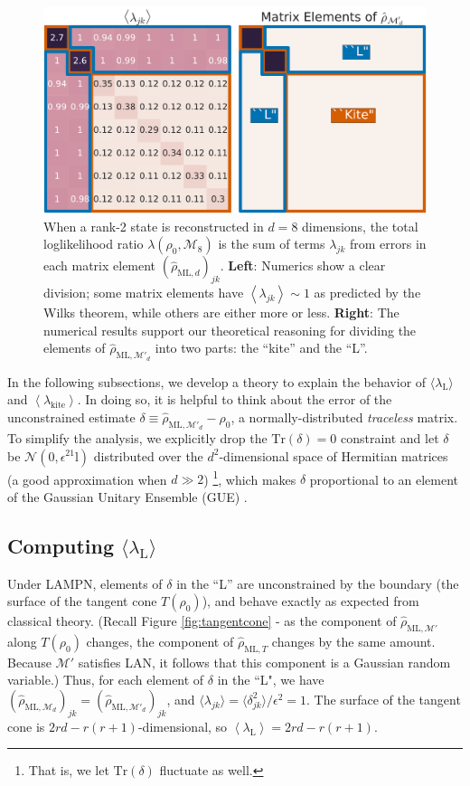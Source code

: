 \documentclass[aps,pra, twocolumn]{revtex4-1}
\newcommand{\M}{\mathcal{M}}
\newcommand{\Tr}{\mathrm{Tr}}
\newcommand{\Id}{\mathbb{I}}
\newcommand{\expect}[1]{\ensuremath{\left\langle#1\right\rangle}}
\def\Id{1\!\mathrm{l}}
\newcommand{\rhohat}{\hat{\rho}}
\newcommand{\rhoML}[1]{\rhohat_{\scriptscriptstyle{\mathrm{ML},#1}}}
\begin{document}
\begin{figure}[h]
\includegraphics[width=\columnwidth]{Images/Figure_3.pdf}
 \caption{When a rank-2 state is reconstructed in $d=8$ dimensions, the total loglikelihood ratio $\lambda(\rho_0,\mathcal{M}_8)$ is the sum of terms $\lambda_{jk}$ from errors in each matrix element $(\rhoML{d})_{jk}$.  \textbf{Left}:  Numerics show a clear division; some matrix elements have $\expect{\lambda_{jk}}\sim1$ as predicted by the Wilks theorem, while others are either more or less. \textbf{Right}:  The numerical results support our theoretical reasoning for dividing the elements of $\rhoML{\M'_{d}}$ into two parts: the ``kite'' and the ``L''.}
\label{fig:L}
\end{figure}

In the following subsections, we develop a theory to explain the behavior of $\langle \lambda_{\mathrm{L}}\rangle$ and \expect{\lambda_{\mathrm{kite}}}.
In doing so, it is helpful to think about the error of the unconstrained estimate $\delta \equiv \rhoML{\M'_{d}}- \rho_{0}$, a normally-distributed \emph{traceless} matrix.  To simplify the analysis, we explicitly drop the $\Tr(\delta)=0$ constraint and let $\delta$ be $\mathcal{N}(0,\epsilon^2\Id)$ distributed over the $d^2$-dimensional space of Hermitian matrices (a good approximation when $d\gg2$) \footnote{That is, we let $\mathrm{Tr}(\delta)$ fluctuate as well.}, which makes $\delta$ proportional to an element of the Gaussian Unitary Ensemble (GUE) \cite{Fyodorov2005}.

\subsection{Computing $\langle \lambda_\mathrm{L}\rangle$}
\label{subsec:L}
Under LAMPN, elements of $\delta$ in the ``L'' are unconstrained by the boundary (the surface of the tangent cone $T(\rho_{0})$), and behave exactly as expected from classical theory. (Recall Figure \ref{fig:tangentcone} - as the component of $\rhoML{\M'}$ along $T(\rho_{0})$ changes, the component of $\rhoML{T}$ changes by the same amount. Because $\M'$ satisfies LAN, it follows that this component is a Gaussian random variable.) Thus, for each element of $\delta$ in the ``L", we have $(\rhoML{\M_{d}})_{jk} = (\rhoML{\M'_{d}})_{jk}$, and $\langle \lambda_{jk} \rangle = \langle \delta_{jk}^{2}\rangle /\epsilon^{2} = 1$. The surface of the tangent cone is $2rd - r(r+1)$-dimensional, so $\expect{\lambda_{\mathrm{L}}} = 2rd - r(r+1)$.
\end{document}
